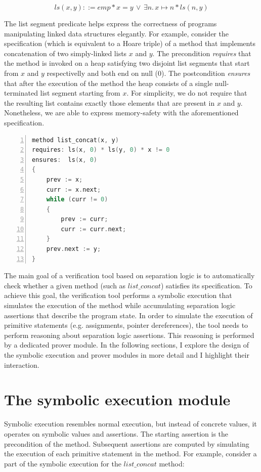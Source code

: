 \documentclass{article}
\begin{document}
\[
	ls(x, y) ::= emp * x = y\, \vee\, \exists n.\,x \mapsto n * ls(n, y)
\]

The list segment predicate helps express the correctness of programs manipulating linked data structures elegantly.
For example, consider the specification (which is equivalent to a Hoare triple) of a method that implements
concatenation of two simply-linked lists $x$ and $y$. The precondition \textit{requires} that the method is
invoked on a heap satisfying two disjoint list segments that start from $x$ and $y$ respectivelly and both end on null (0).
The postcondition \textit{ensures} that after the execution of the method the heap consists of a single null-terminated list segment starting from $x$.
For simplicity, we do not require that the resulting list contains exactly those elements that are present in $x$ and $y$.
Nonetheless, we are able to express memory-safety with the aforementioned specification.

\begin{lstlisting}[language=C, numbers=left, xleftmargin=.5cm]
method list_concat(x, y)
requires: ls(x, 0) * ls(y, 0) * x != 0
ensures:  ls(x, 0)
{
    prev := x;
    curr := x.next;
    while (curr != 0)
    {
        prev := curr;
        curr := curr.next;
    }
    prev.next := y;
}
\end{lstlisting}

The main goal of a verification tool based on separation logic is to automatically check whether a given method (such as $list\_concat$) satisfies its specification.
To achieve this goal, the verification tool performs a symbolic execution that simulates the execution of the method
while accumulating separation logic assertions that describe the program state.
In order to simulate the execution of primitive statements (e.g. assignments, pointer dereferences),
the tool needs to perform reasoning about separation logic assertions.
This reasoning is performed by a dedicated prover module.
In the following sections, I explore the design of the symbolic execution and prover modules in more detail and I highlight their interaction.

\section{The symbolic execution module}

Symbolic execution resembles normal execution, but instead of concrete values, it operates on symbolic values and assertions.
The starting assertion is the precondition of the method.
Subsequent assertions are computed by simulating the execution of each primitive statement in the method.
For example, consider a part of the symbolic execution for the $list\_concat$ method:
\end{document}
